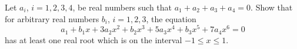 Let $a_i$, $i = 1, 2, 3, 4$, be real numbers such that $a_1 + a_2 + a_3 + a_4 =
0$. Show that for arbitrary real numbers $b_i$, $i = 1, 2, 3$, the equation
$$ a_1 + b_1 x + 3a_2 x^2 + b_2 x^3 + 5a_3 x^4 + b_3 x^5 + 7a_4 x^6 = 0 $$
has at least one real root which is on the interval $-1 \le x \le 1$.
